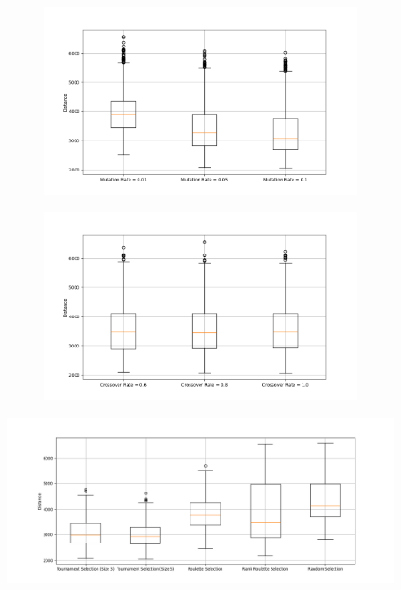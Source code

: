 \documentclass[11pt]{article}
\begin{document}
\begin{figure}[H]
    \centering
    \begin{subfigure}{0.48\textwidth}
        \includegraphics[width=\textwidth]{../results/mutation_rate_boxplot.png}
        \label{fig:m_rate}
    \end{subfigure}
    \begin{subfigure}{0.48\textwidth}
        \includegraphics[width=\textwidth]{../results/crossover_rate_boxplot.png}
        \label{fig:c_rate}
    \end{subfigure}
\end{figure}

\begin{figure}
    \includegraphics[width=\textwidth]{../results/parent_selection_method_boxplot.png}
    \label{fig:parent_selection}
\end{figure}
\end{document}
